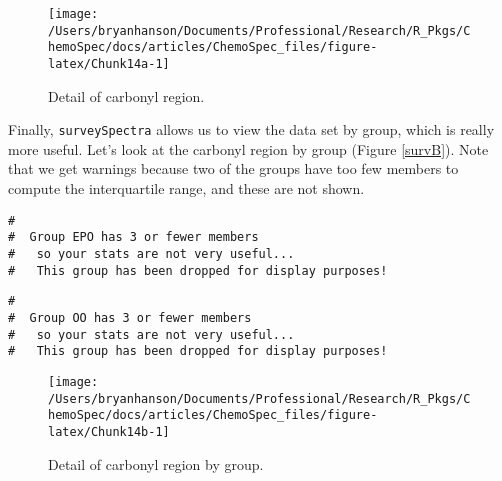 \documentclass[letter,10pt,twocolumn,twoside,printwatermark=false]{pinp}
\begin{document}
\begin{figure}

{\centering \texttt{[image: /Users/bryanhanson/Documents/Professional/Research/R\_Pkgs/ChemoSpec/docs/articles/ChemoSpec\_files/figure-latex/Chunk14a-1]} 

}

\caption{\label{survA}Detail of carbonyl region.}\label{fig:Chunk14a}
\end{figure}

Finally, \texttt{surveySpectra} allows us to view the data set by group,
which is really more useful. Let's look at the carbonyl region by group
(Figure \ref{survB}). Note that we get warnings because two of the
groups have too few members to compute the interquartile range, and
these are not shown.

\begin{Shaded}
\begin{Highlighting}[]
   \NormalTok{,}
   \NormalTok{,}
   \NormalTok{,}
   \NormalTok{(}\NormalTok{, }\NormalTok{))}
\end{Highlighting}
\end{Shaded}

\begin{ShadedResult}
\begin{verbatim}
#  
#  Group EPO has 3 or fewer members
#   so your stats are not very useful...
#   This group has been dropped for display purposes!
\end{verbatim}
\end{ShadedResult}
\begin{ShadedResult}
\begin{verbatim}
#  
#  Group OO has 3 or fewer members
#   so your stats are not very useful...
#   This group has been dropped for display purposes!
\end{verbatim}
\end{ShadedResult}
\begin{figure}

{\centering \texttt{[image: /Users/bryanhanson/Documents/Professional/Research/R\_Pkgs/ChemoSpec/docs/articles/ChemoSpec\_files/figure-latex/Chunk14b-1]} 

}

\caption{\label{survB}Detail of carbonyl region by group.}\label{fig:Chunk14b}
\end{figure}
\end{document}
